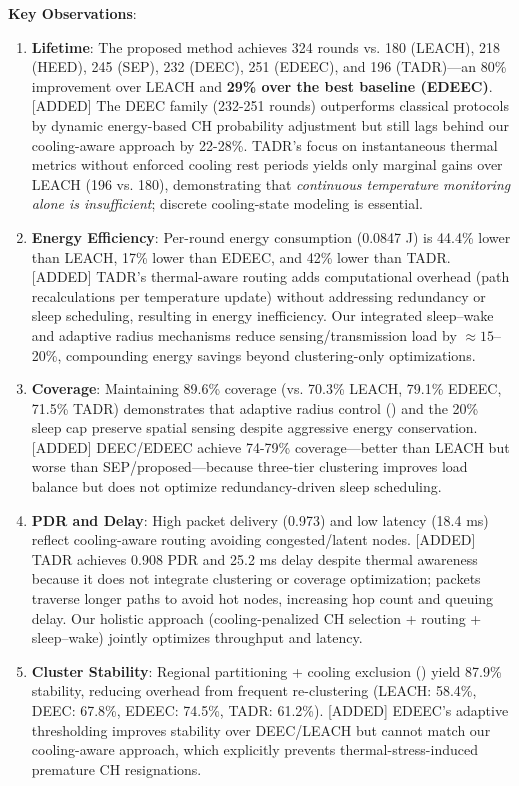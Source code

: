 \textbf{Key Observations}:
\begin{enumerate}[label=\arabic*.,noitemsep]
  \item \textbf{Lifetime}: The proposed method achieves 324 rounds vs. 180 (LEACH), 218 (HEED), 245 (SEP), 232 (DEEC), 251 (EDEEC), and 196 (TADR)—an 80\% improvement over LEACH and \textbf{29\% over the best baseline (EDEEC)}. [ADDED] The DEEC family (232-251 rounds) outperforms classical protocols by dynamic energy-based CH probability adjustment but still lags behind our cooling-aware approach by 22-28\%. TADR's focus on instantaneous thermal metrics without enforced cooling rest periods yields only marginal gains over LEACH (196 vs. 180), demonstrating that \emph{continuous temperature monitoring alone is insufficient}; discrete cooling-state modeling is essential.
  \item \textbf{Energy Efficiency}: Per-round energy consumption (0.0847 J) is 44.4\% lower than LEACH, 17\% lower than EDEEC, and 42\% lower than TADR. [ADDED] TADR's thermal-aware routing adds computational overhead (path recalculations per temperature update) without addressing redundancy or sleep scheduling, resulting in energy inefficiency. Our integrated sleep--wake and adaptive radius mechanisms reduce sensing/transmission load by $\approx 15$--20\%, compounding energy savings beyond clustering-only optimizations.
  \item \textbf{Coverage}: Maintaining 89.6\% coverage (vs. 70.3\% LEACH, 79.1\% EDEEC, 71.5\% TADR) demonstrates that adaptive radius control () and the 20\% sleep cap preserve spatial sensing despite aggressive energy conservation. [ADDED] DEEC/EDEEC achieve 74-79\% coverage—better than LEACH but worse than SEP/proposed—because three-tier clustering improves load balance but does not optimize redundancy-driven sleep scheduling.
  \item \textbf{PDR and Delay}: High packet delivery (0.973) and low latency (18.4 ms) reflect cooling-aware routing avoiding congested/latent nodes. [ADDED] TADR achieves 0.908 PDR and 25.2 ms delay despite thermal awareness because it does not integrate clustering or coverage optimization; packets traverse longer paths to avoid hot nodes, increasing hop count and queuing delay. Our holistic approach (cooling-penalized CH selection + routing + sleep--wake) jointly optimizes throughput and latency.
  \item \textbf{Cluster Stability}: Regional partitioning + cooling exclusion () yield 87.9\% stability, reducing overhead from frequent re-clustering (LEACH: 58.4\%, DEEC: 67.8\%, EDEEC: 74.5\%, TADR: 61.2\%). [ADDED] EDEEC's adaptive thresholding improves stability over DEEC/LEACH but cannot match our cooling-aware approach, which explicitly prevents thermal-stress-induced premature CH resignations.
\end{enumerate}


